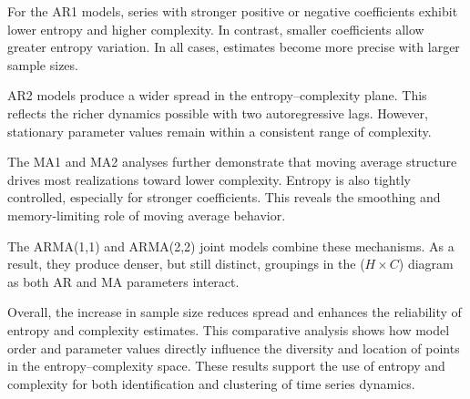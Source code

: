 \documentclass[12pt,a4paper]{article}
\begin{document}
For the AR1 models, series with stronger positive or negative coefficients exhibit lower entropy and higher complexity. In contrast, smaller coefficients allow greater entropy variation. In all cases, estimates become more precise with larger sample sizes.

AR2 models produce a wider spread in the entropy–complexity plane. This reflects the richer dynamics possible with two autoregressive lags. However, stationary parameter values remain within a consistent range of complexity.

The MA1 and MA2 analyses further demonstrate that moving average structure drives most realizations toward lower complexity. Entropy is also tightly controlled, especially for stronger coefficients. This reveals the smoothing and memory-limiting role of moving average behavior.

The ARMA(1,1) and ARMA(2,2) joint models combine these mechanisms. As a result, they produce denser, but still distinct, groupings in the ($H \times C$) diagram as both AR and MA parameters interact.

Overall, the increase in sample size reduces spread and enhances the reliability of entropy and complexity estimates. This comparative analysis shows how model order and parameter values directly influence the diversity and location of points in the entropy–complexity space. These results support the use of entropy and complexity for both identification and clustering of time series dynamics.
	
%	
	
\end{document}
